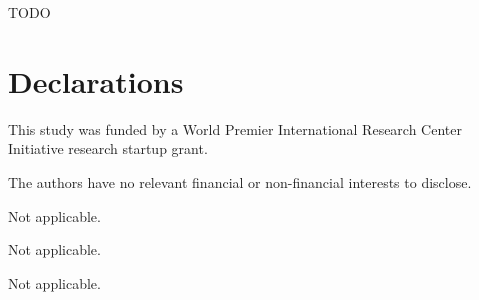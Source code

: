 \documentclass[pdflatex,referee,iicol,sn-basic]{sn-jnl}
\theoremstyle{thmstyleone}%
\theoremstyle{thmstyletwo}%
\theoremstyle{thmstylethree}%
\begin{document}
TODO

\section*{Declarations}

This study was funded by a World Premier International Research Center Initiative research startup grant.

The authors have no relevant financial or non-financial interests to disclose.

Not applicable.

Not applicable.

Not applicable.










\end{document}
